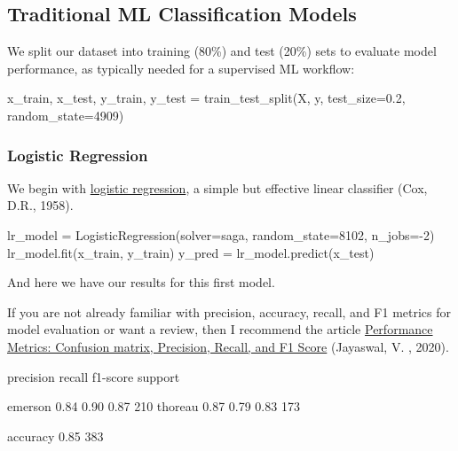 \documentclass[
]{article}
\newenvironment{Shaded}{}{}
\newcommand{\DecValTok}[1]{\textcolor[rgb]{0.25,0.63,0.44}{#1}}
\newcommand{\FloatTok}[1]{\textcolor[rgb]{0.25,0.63,0.44}{#1}}
\newcommand{\NormalTok}[1]{#1}
\newcommand{\OperatorTok}[1]{\textcolor[rgb]{0.40,0.40,0.40}{#1}}
\newcommand{\StringTok}[1]{\textcolor[rgb]{0.25,0.44,0.63}{#1}}
\begin{document}
\subsection{Traditional ML Classification
Models}\label{traditional-ml-classification-models}

We split our dataset into training (80\%) and test (20\%) sets to
evaluate model performance, as typically needed for a supervised ML workflow:

\begin{Shaded}
\begin{Highlighting}[]
\NormalTok{x\_train, x\_test, y\_train, y\_test }\OperatorTok{=}\NormalTok{ train\_test\_split(X, y, test\_size}\OperatorTok{=}\FloatTok{0.2}\NormalTok{, random\_state}\OperatorTok{=}\DecValTok{4909}\NormalTok{)}
\end{Highlighting}
\end{Shaded}

\subsubsection{Logistic Regression}\label{logistic-regression}

We begin with
\href{https://en.wikipedia.org/wiki/Logistic_regression}{logistic
regression}, a simple but effective linear classifier (Cox, D.R., 1958).

\begin{Shaded}
\begin{Highlighting}[]
\NormalTok{lr\_model }\OperatorTok{=}\NormalTok{ LogisticRegression(solver}\OperatorTok{=}\StringTok{\textquotesingle{}saga\textquotesingle{}}\NormalTok{, random\_state}\OperatorTok{=}\DecValTok{8102}\NormalTok{, n\_jobs}\OperatorTok{={-}}\DecValTok{2}\NormalTok{)}
\NormalTok{lr\_model.fit(x\_train, y\_train)}
\NormalTok{y\_pred }\OperatorTok{=}\NormalTok{ lr\_model.predict(x\_test)}
\end{Highlighting}
\end{Shaded}

And here we have our results for this first model.

If you are not already familiar with precision, accuracy, recall, and F1
metrics for model evaluation or want a review, then I recommend the
article
\href{https://towardsdatascience.com/performance-metrics-confusion-matrix-precision-recall-and-f1-score-a8fe076a2262/}{Performance
Metrics: Confusion matrix, Precision, Recall, and F1 Score} (Jayaswal,
V. , 2020).

\begin{Shaded}
\begin{Highlighting}[]
\NormalTok{precision    recall  f1{-}score   support}

\NormalTok{emerson       0.84      0.90      0.87       210}
\NormalTok{thoreau       0.87      0.79      0.83       173}

\NormalTok{accuracy                          0.85       383}
\end{Highlighting}
\end{Shaded}
\end{document}
